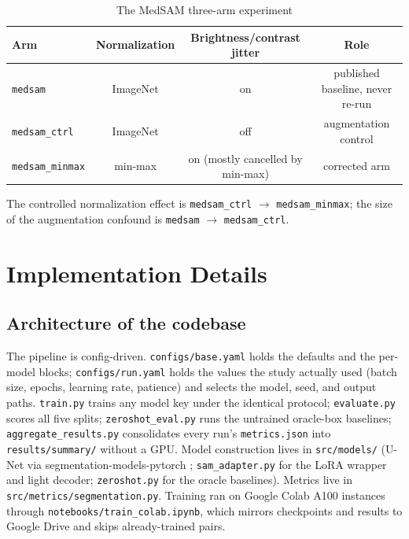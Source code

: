 \documentclass[conference]{IEEEtran}
\begin{document}
\begin{table}[t]
\centering
\footnotesize
\caption{The MedSAM three-arm experiment}
\label{tab:3}
\begin{tabular}{lccc}
\hline
\textbf{Arm} & \textbf{Normalization} & \textbf{Brightness/contrast jitter} & \textbf{Role} \\
\hline
\texttt{medsam} & ImageNet & on & published baseline, never re-run \\
\texttt{medsam\_ctrl} & ImageNet & off & augmentation control \\
\texttt{medsam\_minmax} & min-max & on (mostly cancelled by min-max) & corrected arm \\
\hline
\end{tabular}
\end{table}

The controlled normalization effect is \texttt{medsam\_ctrl} $\rightarrow$ \texttt{medsam\_minmax}; the size of the augmentation confound is \texttt{medsam} $\rightarrow$ \texttt{medsam\_ctrl}.


\section{Implementation Details}\label{sec:5}

\subsection{Architecture of the codebase}\label{sec:5.1}
The pipeline is config-driven. \texttt{configs/base.yaml} holds the defaults and the per-model blocks; \texttt{configs/run.yaml} holds the values the study actually used (batch size, epochs, learning rate, patience) and selects the model, seed, and output paths. \texttt{train.py} trains any model key under the identical protocol; \texttt{evaluate.py} scores all five splits; \texttt{zeroshot\_eval.py} runs the untrained oracle-box baselines; \texttt{aggregate\_results.py} consolidates every run's \texttt{metrics.json} into \texttt{results/summary/} without a GPU. Model construction lives in \texttt{src/models/} (U-Net via segmentation-models-pytorch \cite{ref19}; \texttt{sam\_adapter.py} for the LoRA wrapper and light decoder; \texttt{zeroshot.py} for the oracle baselines). Metrics live in \texttt{src/metrics/segmentation.py}. Training ran on Google Colab A100 instances through \texttt{notebooks/train\_colab.ipynb}, which mirrors checkpoints and results to Google Drive and skips already-trained pairs.
\end{document}
